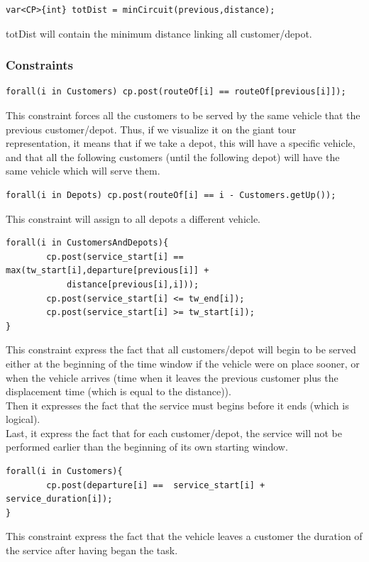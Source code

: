 \documentclass[a4paper ,12pt,french]{article}
\begin{document}
\begin{verbatim}
var<CP>{int} totDist = minCircuit(previous,distance);
\end{verbatim}
totDist will contain the minimum distance linking all customer/depot.


\subsubsection*{Constraints}

\begin{verbatim}
forall(i in Customers) cp.post(routeOf[i] == routeOf[previous[i]]);
\end{verbatim}
This constraint forces all the customers to be served by the same vehicle that the previous customer/depot.
Thus, if we visualize it on the giant tour representation, it means that if we take a depot, this will have a specific vehicle,  and that all the following customers (until the following depot) will have the same vehicle which will serve them.


\begin{verbatim}
forall(i in Depots) cp.post(routeOf[i] == i - Customers.getUp());
\end{verbatim}
This constraint will assign to all depots a different vehicle.

\begin{verbatim}
forall(i in CustomersAndDepots){
        cp.post(service_start[i] == max(tw_start[i],departure[previous[i]] + 
            distance[previous[i],i]));
        cp.post(service_start[i] <= tw_end[i]);
        cp.post(service_start[i] >= tw_start[i]);
}
\end{verbatim}

This constraint express the fact that all customers/depot will begin to be served either at the beginning of the time window if the vehicle were on place sooner, or when the vehicle arrives (time when it leaves the previous customer plus the displacement time (which is equal to the distance)).\\
Then it expresses the fact that the service must begins before it ends (which is logical).\\
Last, it express the fact that for each customer/depot, the service will not be performed earlier than the beginning of its own starting window.

	
	
\begin{verbatim}
forall(i in Customers){
        cp.post(departure[i] ==  service_start[i] + service_duration[i]);
}
\end{verbatim}
This constraint express the fact that the vehicle leaves a customer the duration of the service after having began the task.
	
\end{document}
